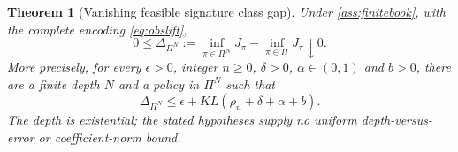 \documentclass[11pt]{article}
\numberwithin{equation}{section}
\newtheorem{theorem}{Theorem}[section]
\theoremstyle{definition}
\theoremstyle{remark}
\theoremstyle{definition}
\begin{document}
\begin{theorem}[Vanishing feasible signature class gap]\label{thm:classgap}
Under \cref{ass:finitebook}, with the complete encoding
\eqref{eq:obslift},
\begin{equation}\label{eq:classgap}
 0\le\Delta_{\Pi^N}:=\inf_{\pi\in\Pi^N}J_\pi-
             \inf_{\pi\in\Pi}J_\pi\downarrow0.
\end{equation}
More precisely, for every $\epsilon>0$, integer $n\ge0$, $\delta>0$,
$\alpha\in(0,1)$ and $b>0$, there are a finite depth $N$ and a policy in
$\Pi^N$ such that
\begin{equation}\label{eq:classgapbudget}
 \Delta_{\Pi^N}\le\epsilon+KL(\rho_n+\delta+\alpha+b).
\end{equation}
The depth is existential; the stated hypotheses supply no uniform
depth-versus-error or coefficient-norm bound.
\end{theorem}
\end{document}
